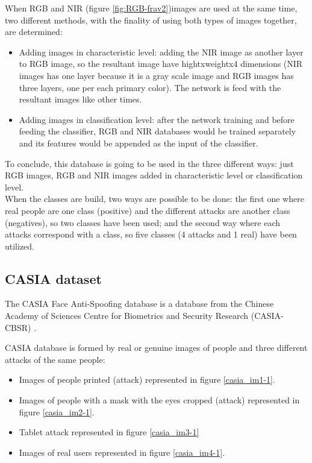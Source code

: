 When RGB and NIR (figure \ref{fig:RGB-frav2})images are used at the same time, two different methods, with the finality of using both types of images together, are determined:
\begin{itemize}
\item Adding images in characteristic level: adding the NIR image as another layer to RGB image, so the resultant image have hightxweightx4 dimensions (NIR images has one layer because it is a gray scale image and RGB images has three layers, one per each primary color). The network is feed with the resultant images like other times.
\item Adding images in classification level: after the network training and before feeding the classifier, RGB and NIR databases would be trained separately and its features would be appended as the input of the classifier.
\end{itemize}

To conclude, this database is going to be used in the three different ways: just RGB images, RGB and NIR images added in characteristic level or classification level.\\

When the classes are build, two ways are possible to be done: the first one where real people are one class (positive) and the different attacks are another class (negatives), so two classes have been used; and the second way where each attacks correspond with a class, so five classes (4 attacks and 1 real) have been utilized.\\

\subsection{CASIA dataset}
The CASIA Face Anti-Spoofing database is a database from the Chinese Academy of Sciences Centre for Biometrics and Security Research (CASIA-CBSR) \cite{Casiadatbase}.

CASIA database is formed by real or genuine images of people and three different attacks of the same people:
\begin{itemize}[itemsep=2pt,topsep=8pt,parsep=0pt,partopsep=20pt]
 \item Images of people printed (attack) represented in figure \ref{casia_im1-1}.
 \item Images of people with a mask with the eyes cropped (attack) represented in figure \ref{casia_im2-1}.
 \item Tablet attack represented in figure \ref{casia_im3-1}
\item Images of real users represented in figure \ref{casia_im4-1}.
 \end{itemize}

